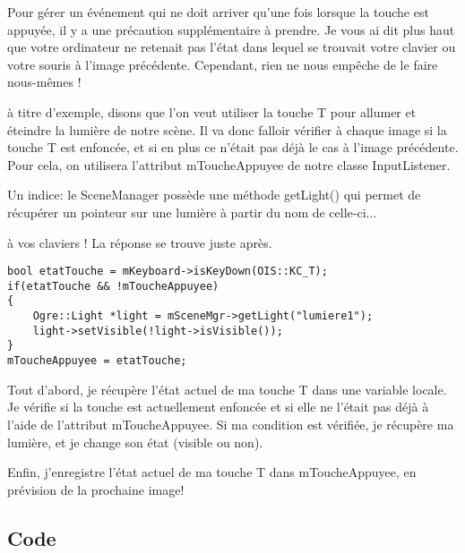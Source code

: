 Pour gérer un événement qui ne doit arriver qu'une fois lorsque la touche est appuyée, il y a une précaution supplémentaire à prendre. Je vous ai dit plus haut que votre ordinateur ne retenait pas l'état dans lequel se trouvait votre clavier ou votre souris à l'image précédente. Cependant, rien ne nous empêche de le faire nous-mêmes !

à titre d'exemple, disons que l'on veut utiliser la touche T pour allumer et éteindre la lumière de notre scène. Il va donc falloir vérifier à chaque image si la touche T est enfoncée, et si en plus ce n'était pas déjà le cas à l'image précédente. Pour cela, on utilisera l'attribut mToucheAppuyee de notre classe InputListener.

Un indice: le SceneManager possède une méthode getLight() qui permet de récupérer un pointeur sur une lumière à partir du nom de celle-ci...

à vos claviers ! La réponse se trouve juste après.



\begin{lstlisting}[caption={Capture de l'état ponctuel d'une touche}]
bool etatTouche = mKeyboard->isKeyDown(OIS::KC_T);
if(etatTouche && !mToucheAppuyee)
{
    Ogre::Light *light = mSceneMgr->getLight("lumiere1");
    light->setVisible(!light->isVisible());
}
mToucheAppuyee = etatTouche;
\end{lstlisting}





Tout d'abord, je récupère l'état actuel de ma touche T dans une variable locale. Je vérifie si la touche est actuellement enfoncée et si elle ne l'était pas déjà à l'aide de l'attribut mToucheAppuyee. Si ma condition est vérifiée, je récupère ma lumière, et je change son état (visible ou non).

Enfin, j'enregistre l'état actuel de ma touche T dans mToucheAppuyee, en prévision de la prochaine image!







\subsection{Code}


